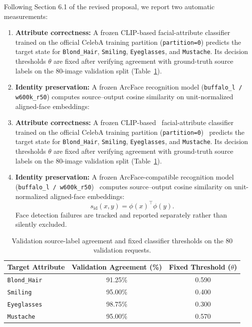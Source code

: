 \documentclass[11pt,a4paper]{article}
\begin{document}
Following Section 6.1 of the revised proposal, we report two automatic measurements:
\begin{enumerate}
    \item \textbf{Attribute correctness:} A frozen CLIP-based facial-attribute classifier trained on the official CelebA training partition (\texttt{partition=0}) predicts the target state for \texttt{Blond\_Hair}, \texttt{Smiling}, \texttt{Eyeglasses}, and \texttt{Mustache}. Its decision thresholds $\theta$ are fixed after verifying agreement with ground-truth source labels on the $80$-image validation split (Table~\ref{tab:val_agreement}).
    \item \textbf{Identity preservation:} A frozen ArcFace recognition model (\texttt{buffalo\_l / w600k\_r50}) computes source--output cosine similarity on unit-normalized aligned-face embeddings:
    \item \textbf{Attribute correctness:} A frozen CLIP-based~\cite{radford2021clip} facial-attribute classifier trained on the official CelebA training partition (\texttt{partition=0})~\cite{liu2015celeba} predicts the target state for \texttt{Blond\_Hair}, \texttt{Smiling}, \texttt{Eyeglasses}, and \texttt{Mustache}. Its decision thresholds $\theta$ are fixed after verifying agreement with ground-truth source labels on the $80$-image validation split (Table~\ref{tab:val_agreement}).
    \item \textbf{Identity preservation:} A frozen ArcFace-compatible recognition model (\texttt{buffalo\_l / w600k\_r50})~\cite{deng2019arcface} computes source--output cosine similarity on unit-normalized aligned-face embeddings:
    \begin{equation}
        s_{\text{id}}(x, y) = \phi(x)^\top \phi(y).
    \end{equation}
    Face detection failures are tracked and reported separately rather than silently excluded.
\end{enumerate}

\begin{table}[H]
\centering
\caption{Validation source-label agreement and fixed classifier thresholds on the 80 validation requests.}
\label{tab:val_agreement}
\begin{tabular}{lcc}
\toprule
\textbf{Target Attribute} & \textbf{Validation Agreement (\%)} & \textbf{Fixed Threshold ($\theta$)} \\
\midrule
\texttt{Blond\_Hair} & 91.25\% & 0.590 \\
\texttt{Smiling}     & 95.00\% & 0.400 \\
\texttt{Eyeglasses}  & 98.75\% & 0.300 \\
\texttt{Mustache}    & 95.00\% & 0.570 \\
\bottomrule
\end{tabular}
\end{table}
\end{document}
